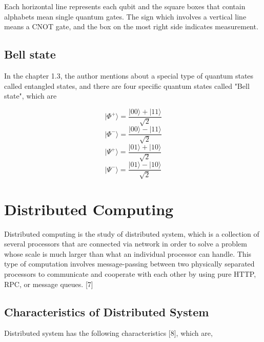 Each horizontal line represents each qubit and the square boxes that contain alphabets mean single quantum gates.  The sign which involves a vertical line means a CNOT gate, and the box on the most right side indicates measurement. 

\subsection{Bell state}

In the chapter 1.3, the author mentions about a special type of quantum states called entangled states, and there are four specific quantum states called "Bell state", which are

$$ |\Phi^+\rangle = \frac{|00\rangle + |11\rangle}{\sqrt{2}}$$
$$ |\Phi^-\rangle = \frac{|00\rangle - |11\rangle}{\sqrt{2}}$$
$$ |\Psi^+\rangle = \frac{|01\rangle + |10\rangle}{\sqrt{2}}$$
$$ |\Psi^-\rangle = \frac{|01\rangle - |10\rangle}{\sqrt{2}}$$

\section{Distributed Computing}

 Distributed computing is the study of distributed system, which is a collection of several processors that are connected via network in order to solve a problem whose scale is much larger than what an individual processor can handle.  This type of computation involves message-passing between two physically separated processors to communicate and cooperate with each other by using pure HTTP, RPC, or message queues. [7] 
 
 \subsection{Characteristics of Distributed System}
 \par Distributed system has the following characteristics [8], which are,
 
